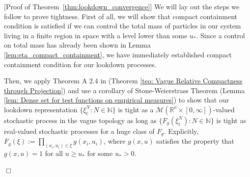 \documentclass[12pt]{article}
\newenvironment {proof}{{\noindent\bf Proof }}{\hfill $\Box$ \medskip}
\begin{document}
\begin{proof}[Proof of Theorem~\ref{thm:lookdown_convergence}]
We will lay out the steps we follow to prove tightness. First of all, we will
    show that compact containment condition is satisfied if we can control the
    total mass of particles in our system living in a finite region in space
    with a level lower than some $u_{*}$. Since a control on total mass has
    already been shown in Lemma \ref{lem:eta_compact_containment}, we have
    immediately established compact containment condition for our lookdown
    processes. 

Then, we apply Theorem A 2.4 in \cite{kallenberg1997foundations} (Theorem
    \ref{teo: Vague Relative Compactness through Projection}) and use a
    corollary of Stone-Weierstrass Theorem (Lemma \ref{lem: Dense set for test
    functions on empirical measures}) to show that our lookdown representation
    $\{\xi^N_t: N \in \mathbb{N}\}$ is tight as a $\mathcal{M}(\mathbb{R^d}
    \times [0, \infty])$-valued stochastic process in the vague topology as
    long as $\{F_g(\xi^N_t): N \in \mathbb{N}\}$ is tight as real-valued
    stochastic processes for a huge class of $F_g$. Explicitly, $F_g(\xi):=
    \prod_{(x_i,u_i)\in \xi}g(x_i,u_i)$, where $g(x,u)$ satisfies the property
    that $g(x,u) = 1 $ for all $u \geq u_{*}$ for some $u_{*}>0$.


\end{proof}
\end{document}
